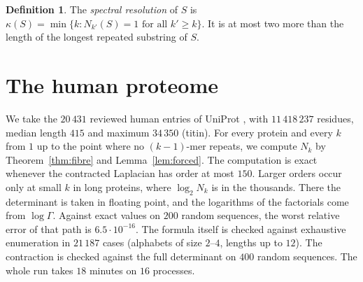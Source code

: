 \documentclass[11pt]{article}
\theoremstyle{plain}
\theoremstyle{definition}
\newtheorem{definition}[theorem]{Definition}
\theoremstyle{remark}
\begin{document}
\begin{definition}\label{def:kappa}
The \emph{spectral resolution} of $S$ is $\kappa(S)=\min\{k:N_{k'}(S)=1\text{ for all }k'\ge k\}$.
It is at most two more than the length of the longest repeated substring of $S$.
\end{definition}

\section{The human proteome}\label{sec:proteome}

We take the $20\,431$ reviewed human entries of UniProt \cite{UniProt}, with $11\,418\,237$ residues,
median length $415$ and maximum $34\,350$ (titin). For every protein and every $k$ from $1$ up to the
point where no $(k-1)$-mer repeats, we compute $N_k$ by Theorem~\ref{thm:fibre} and
Lemma~\ref{lem:forced}. The computation is exact whenever the contracted Laplacian has order at most
$150$. Larger orders occur only at small $k$ in long proteins, where $\log_2N_k$ is in the thousands.
There the determinant is taken in floating point, and the logarithms of the factorials come from
$\log\Gamma$. Against exact values on $200$ random sequences, the worst relative error of that path
is $6.5\cdot10^{-16}$. The formula itself is checked against exhaustive enumeration in $21\,187$ cases
(alphabets of size $2$--$4$, lengths up to $12$). The contraction is checked against the full
determinant on $400$ random sequences. The whole run takes $18$ minutes on $16$ processes.
\end{document}
